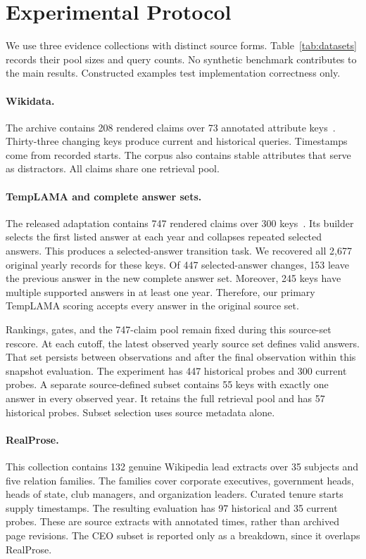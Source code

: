 \section{Experimental Protocol}
\label{sec:protocol}

We use three evidence collections with distinct source forms.
Table~\ref{tab:datasets} records their pool sizes and query counts.
No synthetic benchmark contributes to the main results.
Constructed examples test implementation correctness only.


\paragraph{Wikidata.}
The archive contains 208 rendered claims over 73 annotated attribute keys~\citep{vrandecic2014wikidata}.
Thirty-three changing keys produce current and historical queries.
Timestamps come from recorded starts.
The corpus also contains stable attributes that serve as distractors.
All claims share one retrieval pool.

\paragraph{TempLAMA and complete answer sets.}
The released adaptation contains 747 rendered claims over 300 keys~\citep{dhingra2022templama}.
Its builder selects the first listed answer at each year and collapses repeated selected answers.
This produces a selected-answer transition task.
We recovered all 2,677 original yearly records for these keys.
Of 447 selected-answer changes, 153 leave the previous answer in the new complete answer set.
Moreover, 245 keys have multiple supported answers in at least one year.
Therefore, our primary TempLAMA scoring accepts every answer in the original source set.

Rankings, gates, and the 747-claim pool remain fixed during this source-set rescore.
At each cutoff, the latest observed yearly source set defines valid answers.
That set persists between observations and after the final observation within this snapshot evaluation.
The experiment has 447 historical probes and 300 current probes.
A separate source-defined subset contains 55 keys with exactly one answer in every observed year.
It retains the full retrieval pool and has 57 historical probes.
Subset selection uses source metadata alone.

\paragraph{RealProse.}
This collection contains 132 genuine Wikipedia lead extracts over 35 subjects and five relation families.
The families cover corporate executives, government heads, heads of state, club managers, and organization leaders.
Curated tenure starts supply timestamps.
The resulting evaluation has 97 historical and 35 current probes.
These are source extracts with annotated times, rather than archived page revisions.
The CEO subset is reported only as a breakdown, since it overlaps RealProse.

